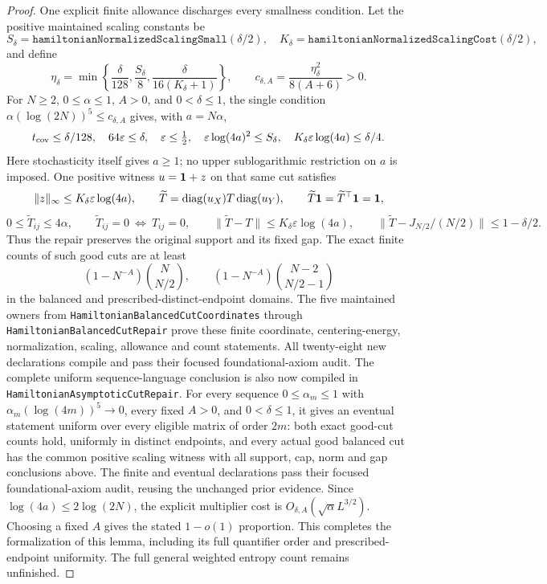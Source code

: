 \begin{proof}
One explicit finite allowance discharges every smallness condition.
Let the positive maintained scaling constants be
\[
 S_\delta=\texttt{hamiltonianNormalizedScalingSmall}(\delta/2),\quad
 K_\delta=\texttt{hamiltonianNormalizedScalingCost}(\delta/2),
\]
and define
\[
 \eta_\delta=\min\left\{\frac{\delta}{128},
       \frac{S_\delta}{8},\frac{\delta}{16(K_\delta+1)}\right\},
 \qquad c_{\delta,A}=\frac{\eta_\delta^2}{8(A+6)}>0 .
\]
For \(N\geq2\), \(0\leq\alpha\leq1\), \(A>0\), and
\(0<\delta\leq1\), the single condition
\(\alpha(\log(2N))^5\leq c_{\delta,A}\) gives, with \(a=N\alpha\),
\[
 t_{\rm cov}\leq\delta/128,\quad64\varepsilon\leq\delta,\quad
 \varepsilon\leq\tfrac12,\quad
 \varepsilon\log(4a)^2\leq S_\delta,\quad
 K_\delta\varepsilon\log(4a)\leq\delta/4 .
\]
Here stochasticity itself gives \(a\geq1\); no upper sublogarithmic
restriction on \(a\) is imposed.
One positive witness \(u=\mathbf1+z\) on that same cut satisfies
\[
 \|z\|_\infty\leq K_\delta\varepsilon\log(4a),\qquad
 \widetilde T=\operatorname{diag}(u_X)T\operatorname{diag}(u_Y),\qquad
 \widetilde T\mathbf1=\widetilde T^\top\mathbf1=\mathbf1,
\]
\[
 0\leq\widetilde T_{ij}\leq4\alpha,\qquad
 \widetilde T_{ij}=0\ \Longleftrightarrow\ T_{ij}=0,\qquad
 \|\widetilde T-T\|\leq K_\delta\varepsilon\log(4a),\qquad
 \|\widetilde T-J_{N/2}/(N/2)\|\leq1-\delta/2 .
\]
Thus the repair preserves the original support and its fixed gap.
The exact finite counts of such good cuts are at least
\[
 (1-N^{-A})\binom N{N/2},\qquad
 (1-N^{-A})\binom{N-2}{N/2-1}
\]
in the balanced and prescribed-distinct-endpoint domains.
The five maintained owners from
\texttt{HamiltonianBalancedCutCoordinates} through
\texttt{HamiltonianBalancedCutRepair} prove these finite coordinate,
centering-energy, normalization, scaling, allowance and count statements.
All twenty-eight new declarations compile and pass their focused
foundational-axiom audit.
The complete uniform sequence-language conclusion is also now
compiled in \texttt{HamiltonianAsymptoticCutRepair}.
For every sequence \(0\leq\alpha_m\leq1\) with
\(\alpha_m(\log(4m))^5\to0\), every fixed \(A>0\), and
\(0<\delta\leq1\), it gives an eventual statement uniform over
every eligible matrix of order \(2m\): both exact good-cut counts
hold, uniformly in distinct endpoints, and every actual good
balanced cut has the common positive scaling witness with all
support, cap, norm and gap conclusions above.
The finite and eventual declarations pass their focused
foundational-axiom audit, reusing the unchanged prior evidence.
Since \(\log(4a)\leq2\log(2N)\), the explicit multiplier cost is
\(O_{\delta,A}(\sqrt{\alpha}L^{3/2})\).
Choosing a fixed \(A\) gives the stated \(1-o(1)\) proportion.
This completes the formalization of this lemma, including its
full quantifier order and prescribed-endpoint uniformity.
The full general weighted entropy count remains unfinished.
\end{proof}


